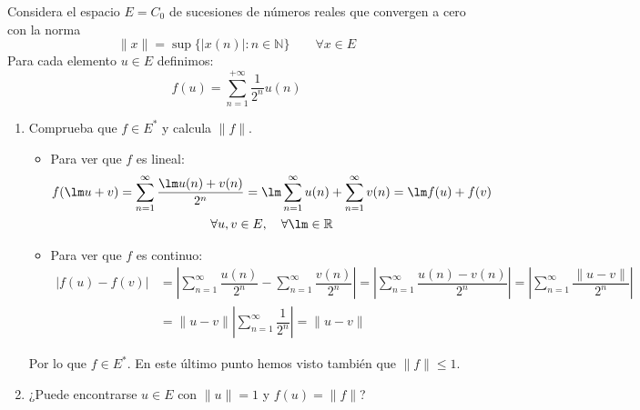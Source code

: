 \begin{ejercicio}
    Considera el espacio $E=C_0$ de sucesiones de números reales que convergen a cero con la norma 
    \begin{equation*}
        \|x\| = \sup\{|x(n)| : n\in \mathbb{N}\} \qquad \forall x\in E
    \end{equation*}
    Para cada elemento $u\in E$ definimos:
    \begin{equation*}
        f(u) = \sum_{n=1}^{+\infty}\dfrac{1}{2^n}u(n)
    \end{equation*}
    \begin{enumerate}[label=\alph*)]
        \item Comprueba que $f\in E^\ast$ y calcula $\|f\|$.

            \begin{itemize}
                \item Para ver que $f$ es lineal:
                    \begin{multline*}
                        f(\lm u + v) = \sum_{n=1}^{\infty} \dfrac{\lm u(n)+v(n)}{2^n} = \lm \sum_{n=1}^{\infty}u(n) + \sum_{n=1}^{\infty}v(n) = \lm f(u)+f(v) \\ \forall u,v\in E, \quad \forall \lm\in \mathbb{R}
                    \end{multline*}
                \item Para ver que $f$ es continuo:
                    \begin{align*}
                        |f(u)-f(v)| &= \left|\sum_{n=1}^{\infty}\dfrac{u(n)}{2^n} - \sum_{n=1}^{\infty}\dfrac{v(n)}{2^n}\right| = \left|\sum_{n=1}^{\infty}\dfrac{u(n)-v(n)}{2^n}\right| = \left|\sum_{n=1}^{\infty}\dfrac{\|u-v\|}{2^n}\right| \\ &= \|u-v\| \left|\sum_{n=1}^{\infty}\dfrac{1}{2^n}\right| = \|u-v\|
                    \end{align*}
            \end{itemize}
            Por lo que $f\in E^\ast$. En este último punto hemos visto también que $\|f\|\leq 1$.

        \item ¿Puede encontrarse $u\in E$ con $\|u\| = 1$ y $f(u) = \|f\|$?

    \end{enumerate}
\end{ejercicio}

